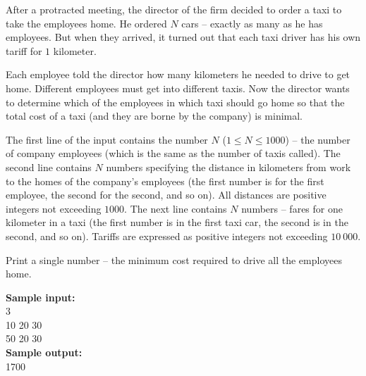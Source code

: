 \documentclass[a4paper]{article}
\begin{document}
After a protracted meeting, the director of the firm decided to order a taxi to take the employees home. He ordered $N$ cars -- exactly as many as he has employees. But when they arrived, it turned out that each taxi driver has his own tariff for $1$ kilometer.

Each employee told the director how many kilometers he needed to drive to get home. Different employees must get into different taxis. Now the director wants to determine which of the employees in which taxi should go home so that the total cost of a taxi (and they are borne by the company) is minimal.

The first line of the input contains the number $N$ ($1 \le N \le 1000$) -- the number of company employees (which is the same as the number of taxis called). The second line contains $N$ numbers specifying the distance in kilometers from work to the homes of the company's employees (the first number is for the first employee, the second for the second, and so on). All distances are positive integers not exceeding $1000$. The next line contains $N$ numbers -- fares for one kilometer in a taxi (the first number is in the first taxi car, the second is in the second, and so on). Tariffs are expressed as positive integers not exceeding $10 \ 000$.

Print a single number -- the minimum cost required to drive all the employees home.

\LINE

\noindent \textbf{Sample input:}\\
3\\
10 20 30\\
50 20 30\\


\noindent \textbf{Sample output:}\\
1700
\end{document}

